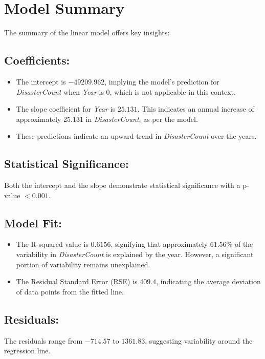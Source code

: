\documentclass[11pt]{article}\usepackage[]{graphicx}\usepackage[]{xcolor}
\begin{document}
\section*{Model Summary}
The summary of the linear model offers key insights:

\subsection*{Coefficients:}
\begin{itemize}
    \item The intercept is $-49209.962$, implying the model's prediction for \textit{DisasterCount} when \textit{Year} is 0, which is not applicable in this context.
    \item The slope coefficient for \textit{Year} is $25.131$. This indicates an annual increase of approximately 25.131 in \textit{DisasterCount}, as per the model.
    \item These predictions indicate an upward trend in \textit{DisasterCount} over the years.
\end{itemize}

\subsection*{Statistical Significance:}
Both the intercept and the slope demonstrate statistical significance with a p-value $< 0.001$.

\subsection*{Model Fit:}
\begin{itemize}
    \item The R-squared value is $0.6156$, signifying that approximately 61.56\% of the variability in \textit{DisasterCount} is explained by the year. However, a significant portion of variability remains unexplained.
    \item The Residual Standard Error (RSE) is $409.4$, indicating the average deviation of data points from the fitted line.
\end{itemize}

\subsection*{Residuals:}
The residuals range from $-714.57$ to $1361.83$, suggesting variability around the regression line.
\end{document}
